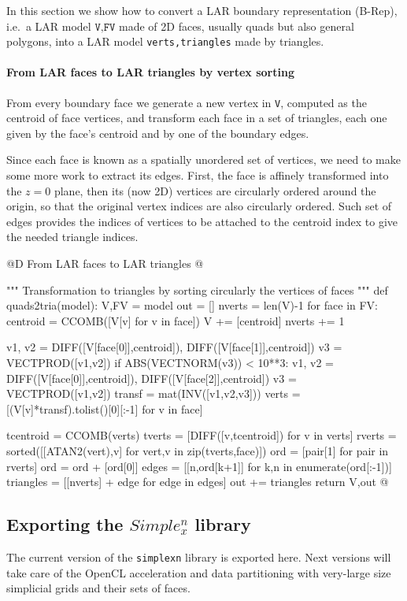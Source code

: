 \documentclass[11pt,oneside]{article}	%
\begin{document}
In this section we show how to convert a LAR boundary representation (B-Rep), i.e.~a LAR model $\texttt{V,FV}$ made of 2D faces, usually quads but also general polygons, into a LAR model \texttt{verts,triangles} made by triangles.

\paragraph{From LAR faces to LAR triangles by vertex sorting}
From every boundary face we generate a new vertex in \texttt{V}, computed as the centroid of face vertices, and transform each face in a set of triangles, each one given by the face's centroid and by one of the boundary edges. 

Since each face is known as a spatially unordered set of vertices, we need to make some more work to extract its edges. First, the face is affinely transformed into the $z=0$ plane, then its (now 2D) vertices are circularly ordered around the origin, so that the original vertex indices are also circularly ordered. Such set of edges provides the indices of vertices to be attached to the centroid index to give the needed triangle indices.

@D From LAR faces to LAR triangles
@{""" Transformation to triangles by sorting circularly the vertices of faces """
def quads2tria(model):
	V,FV = model
	out = []
	nverts = len(V)-1
	for face in FV:
		centroid = CCOMB([V[v] for v in face])
		V += [centroid] 
		nverts += 1
		
		v1, v2 = DIFF([V[face[0]],centroid]), DIFF([V[face[1]],centroid])
		v3 = VECTPROD([v1,v2])
		if ABS(VECTNORM(v3)) < 10**3:
			v1, v2 = DIFF([V[face[0]],centroid]), DIFF([V[face[2]],centroid])
			v3 = VECTPROD([v1,v2])
		transf = mat(INV([v1,v2,v3]))
		verts = [(V[v]*transf).tolist()[0][:-1]  for v in face]

		tcentroid = CCOMB(verts)
		tverts = [DIFF([v,tcentroid]) for v in verts]	
		rverts = sorted([[ATAN2(vert),v] for vert,v in zip(tverts,face)])
		ord = [pair[1] for pair in rverts]
		ord = ord + [ord[0]]
		edges = [[n,ord[k+1]] for k,n in enumerate(ord[:-1])]
		triangles = [[nverts] + edge for edge in edges]
		out += triangles
	return V,out
@}


\subsection{Exporting the $Simple_x^n$ library}
The current version of the \texttt{simplexn} library is exported here. Next versions will take care of the OpenCL acceleration and data partitioning with very-large size simplicial grids and their sets of faces.
\end{document}
